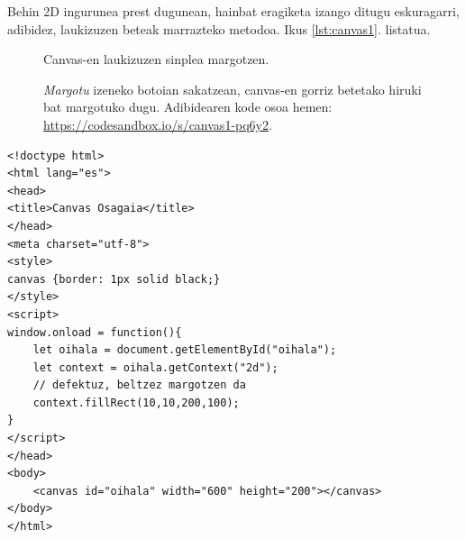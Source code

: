 Behin 2D ingurunea prest dugunean, hainbat eragiketa izango ditugu eskuragarri, adibidez, laukizuzen beteak marrazteko   metodoa. Ikus \ref{lst:canvas1}. listatua.


\begin{figure}[ht]
	\centering
{}
\caption{Canvas-en laukizuzen sinplea margotzen.}
\label{fig:canvaslaukia}
\end{figure}


\begin{figure}[ht]
	\centering
{}
\caption{\textit{Margotu} izeneko botoian sakatzean, canvas-en gorriz betetako hiruki bat margotuko dugu. Adibidearen kode osoa hemen: \href{https://codesandbox.io/s/canvas1-pq6y2}{https://codesandbox.io/s/canvas1-pq6y2}.}
\label{fig:canvashirukia}
\end{figure}

\begin{lstlisting}[language=HTML5,caption={Laukizuzen bat margotuko dugu canvas osagaian.},label={lst:canvas1}]
<!doctype html>
<html lang="es">
<head>
<title>Canvas Osagaia</title>
</head>
<meta charset="utf-8">
<style>
canvas {border: 1px solid black;}
</style>
<script>
window.onload = function(){
    let oihala = document.getElementById("oihala");
    let context = oihala.getContext("2d");
    // defektuz, beltzez margotzen da
    context.fillRect(10,10,200,100);
}
</script>
</head>
<body>
    <canvas id="oihala" width="600" height="200"></canvas>
</body>
</html>
 \end{lstlisting}

